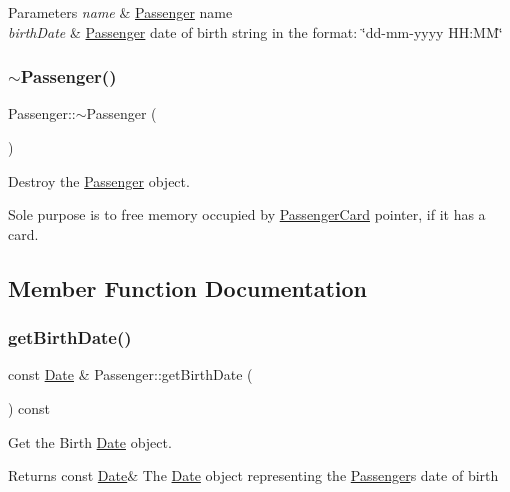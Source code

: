 \begin{DoxyParams}{Parameters}
{\em name} & \mbox{\hyperlink{classPassenger}{Passenger}} name \\
\hline
{\em birth\+Date} & \mbox{\hyperlink{classPassenger}{Passenger}} date of birth string in the format\+: \char`\"{}dd-\/mm-\/yyyy H\+H\+:\+M\+M\char`\"{} \\
\hline
\end{DoxyParams}
\mbox{\label{classPassenger_a6a6747cafd45d2c85db2ec4e873be3c7}} 
\subsubsection{\texorpdfstring{$\sim$\+Passenger()}{~Passenger()}}
{\footnotesize\ttfamily Passenger\+::$\sim$\+Passenger (\begin{DoxyParamCaption}{ }\end{DoxyParamCaption})}



Destroy the \mbox{\hyperlink{classPassenger}{Passenger}} object. 

Sole purpose is to free memory occupied by \mbox{\hyperlink{classPassengerCard}{Passenger\+Card}} pointer, if it has a card. 

\subsection{Member Function Documentation}
\mbox{\label{classPassenger_aa2101584d2f0daf83ef58e0491754395}} 
\subsubsection{\texorpdfstring{get\+Birth\+Date()}{getBirthDate()}}
{\footnotesize\ttfamily const \mbox{\hyperlink{classDate}{Date}} \& Passenger\+::get\+Birth\+Date (\begin{DoxyParamCaption}{ }\end{DoxyParamCaption}) const}



Get the Birth \mbox{\hyperlink{classDate}{Date}} object. 

\begin{DoxyReturn}{Returns}
const \mbox{\hyperlink{classDate}{Date}}\& The \mbox{\hyperlink{classDate}{Date}} object representing the \mbox{\hyperlink{classPassenger}{Passenger}}\textquotesingle{}s date of birth 
\end{DoxyReturn}
\mbox{\label{classPassenger_ae8d5310db80438702dec5f4d649289f1}} 
